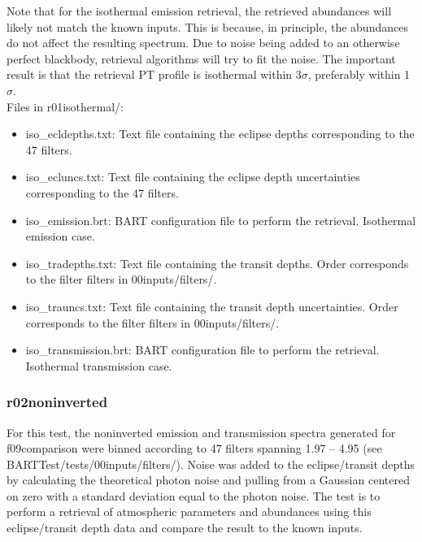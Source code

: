 \documentclass[letterpaper, 12pt]{article}
\begin{document}
Note that for the isothermal emission retrieval, the retrieved abundances will 
likely not match the known inputs. This is because, in principle, the 
abundances do not affect the resulting spectrum. Due to noise being added to 
an otherwise perfect blackbody, retrieval algorithms will try to 
fit the noise. The important result is that the retrieval PT profile is 
isothermal within 3$\sigma$, preferably within 1$\sigma$.\\

Files in r01isothermal/:
\begin{itemize} \itemsep0pt
  \item iso{\_}ecldepths.txt: Text file containing the eclipse depths corresponding to the 47 filters.
  \item iso{\_}ecluncs.txt: Text file containing the eclipse depth uncertainties corresponding to the 47 filters.
  \item iso{\_}emission.brt: BART configuration file to perform the retrieval. 
        Isothermal emission case.
  \item iso{\_}tradepths.txt: Text file containing the transit depths. Order 
        corresponds to the filter filters in 00inputs/filters/.
  \item iso{\_}trauncs.txt: Text file containing the transit depth uncertainties. 
        Order corresponds to the filter filters in 00inputs/filters/.
  \item iso{\_}transmission.brt: BART configuration file to perform the 
        retrieval. Isothermal transmission case.
\end{itemize}

\subsubsection{r02noninverted}
For this test, the noninverted emission and transmission spectra generated for 
f09comparison were binned according to 47 filters spanning 
1.97 -- 4.95 \microns (see BARTTest/tests/00inputs/filters/). 
Noise was added to the eclipse/transit 
depths by calculating the theoretical photon noise and pulling from a Gaussian 
centered on zero with a standard deviation equal to the photon noise. The test 
is to perform a retrieval of atmospheric parameters and abundances using this 
eclipse/transit depth data and compare the result to the known inputs.\\
\end{document}
